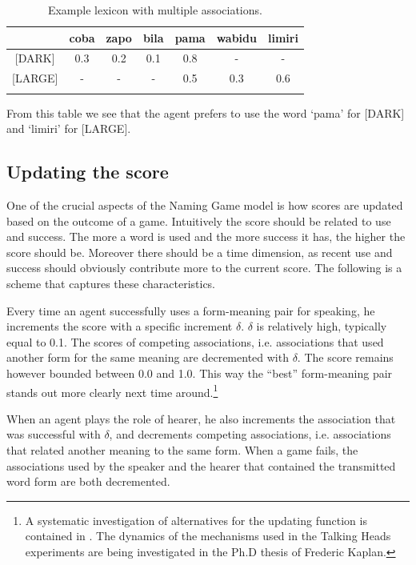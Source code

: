 \begin{table}
\begin{center}
\begin{tabular}{c c c c  c  c  c } \lsptoprule 
& coba & zapo & bila & pama & wabidu & limiri \\ 
\midrule {}		
{}[DARK] & 0.3 & 0.2 & 0.1 & 0.8 & - & - \\ 
{}[LARGE] & - & - & - & 0.5 & 0.3 & 0.6 \\ 
\lspbottomrule
\end{tabular}
\caption{\label{tab:mem2}Example lexicon with multiple associations.}
\end{center}
\end{table}
From this table we see that the agent prefers to use the 
word `pama' for [DARK] and `limiri' for [LARGE]. 

\subsection{Updating the score}

One of the crucial aspects of the Naming Game model
is how scores are updated based on the outcome of 
a game. Intuitively 
the score should be related to use and success. 
The more a word is used and the more success it 
has, the higher the score should be. Moreover
there should be a time dimension, 
as recent use and success should obviously contribute
more to the current score. 
The following is a scheme that captures these
characteristics. 

Every time an agent successfully uses a form-meaning pair 
for speaking, he increments
the score with a specific increment $\delta$. 
$\delta$ is relatively high, typically equal to 0.1. 
The scores of competing associations, i.e. 
associations that used another form for the same meaning
are decremented with $\delta$. The score remains however bounded 
between 0.0 and 1.0. This way the ``best'' 
form-meaning pair stands out more clearly next time 
around.\footnote{A systematic investigation of alternatives for 
the updating function is contained in \cite{Oliphant:1997}. 
The dynamics of the mechanisms used in the 
Talking Heads experiments are being investigated in the
Ph.D thesis of Frederic Kaplan.}

When an agent plays the role of hearer, he also increments
the association that was successful with $\delta$, and 
decrements competing associations, i.e. associations that related
another meaning to the same form. When a 
game fails, the associations used by the speaker
and the hearer that contained the transmitted 
word form are both decremented. 


